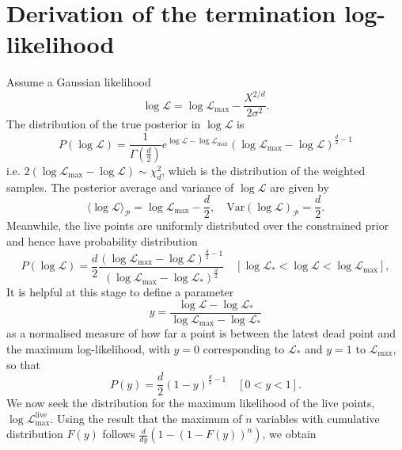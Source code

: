 \documentclass[usenatbib]{mnras}
\begin{document}
\section{Derivation of the termination log-likelihood }
Assume a Gaussian likelihood
\begin{equation}\label{eq:logL}
	\log\mathcal{L} = \log\mathcal{L}_\mathrm{max} - \frac{X^{2/d}}{2\sigma^2}.
\end{equation}
The distribution of the true posterior in $\log\mathcal{L}$ is
\begin{equation}
    P(\log\mathcal{L}) = \frac{1}{\Gamma(\frac{d}{2})}e^{\log\mathcal{L}-\log\mathcal{L}_\mathrm{max}} (\log\mathcal{L}_\mathrm{max}-\log\mathcal{L})^{\frac{d}{2}-1}
\end{equation}
i.e. $2(\log\mathcal{L}_\mathrm{max}-\log\mathcal{L}) \sim \chi^2_{d}$, which is the distribution of the weighted samples. The posterior average and variance of $\log \mathcal{L}$ are given by
\begin{equation}
    \langle\log\mathcal{L}\rangle_\mathcal{P} = \log\mathcal{L}_\mathrm{max} - \frac{d}{2},  \quad \mathrm{Var}(\log\mathcal{L})_\mathcal{P} = \frac{d}{2}.
\end{equation}
Meanwhile, the live points are uniformly distributed over the constrained prior and hence have probability distribution
\begin{equation}
	P(\log\mathcal{L}) = \frac{d}{2}\frac{(\log\mathcal{L}_\mathrm{max}-\log\mathcal{L})^{\frac{d}{2}-1}}{(\log\mathcal{L}_\mathrm{max}-\log\mathcal{L}_*)^{\frac{d}{2}}} \quad [\log\mathcal{L}_* < \log\mathcal{L} <\log\mathcal{L}_\mathrm{max}],
    \label{eq:PL}
\end{equation}
It is helpful at this stage to define a parameter
\begin{equation}
    y = \frac{\log\mathcal{L}-\log\mathcal{L}_*}{\log\mathcal{L}_\mathrm{max}-\log\mathcal{L}_*}
    \label{eq:y}
\end{equation}
as a normalised measure of how far a point is between the latest dead point and the maximum log-likelihood, with $y=0$ corresponding to $\mathcal{L}_*$ and $y=1$ to $\mathcal{L}_\mathrm{max}$, so that
\begin{equation}
    P(y) = \frac{d}{2}(1-y)^{\frac{d}{2}-1} \quad [0<y<1].
    \label{eq:Py}
\end{equation}
We now seek the distribution for the maximum likelihood of the live points, $\log\mathcal{L}_\mathrm{max}^{\mathrm{live}}$. Using the result that the maximum of $n$ variables with cumulative distribution $F(y)$ follows $\frac{d}{dy}( 1- (1-F(y))^n)$, we obtain
\end{document}
